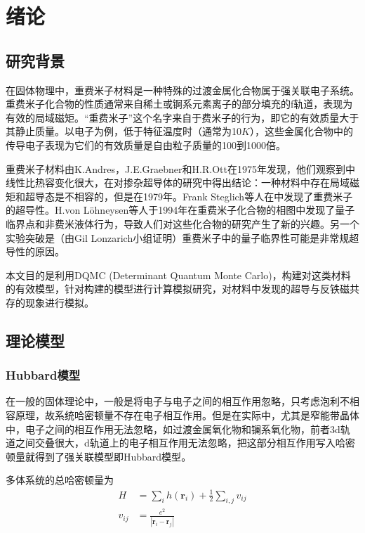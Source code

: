 \section{绪论}
\subsection{研究背景}
在固体物理中，重费米子材料是一种特殊的过渡金属化合物属于强关联电子系统。重费米子化合物的性质通常来自稀土或锕系元素离子的部分填充的f轨道，表现为有效的局域磁矩。“重费米子”这个名字来自于费米子的行为，即它的有效质量大于其静止质量。以电子为例，低于特征温度时（通常为10$K$），这些金属化合物中的传导电子表现为它们的有效质量是自由粒子质量的100到1000倍。

重费米子材料由K.Andres，J.E.Graebner和H.R.Ott在1975年发现，他们观察到中线性比热容变化很大，在对掺杂超导体的研究中得出结论：一种材料中存在局域磁矩和超导态是不相容的，但是在1979年。Frank Steglich等人在中发现了重费米子的超导性。H.von Löhneysen等人于1994年在重费米子化合物的相图中发现了量子临界点和非费米液体行为，导致人们对这些化合物的研究产生了新的兴趣。另一个实验突破是（由Gil Lonzarich小组证明）重费米子中的量子临界性可能是非常规超导性的原因。


本文目的是利用DQMC (Determinant Quantum Monte Carlo)，构建对这类材料的有效模型，针对构建的模型进行计算模拟研究，对材料中发现的超导与反铁磁共存的现象进行模拟。






\subsection{理论模型}

\subsubsection{Hubbard模型}
在一般的固体理论中，一般是将电子与电子之间的相互作用忽略，只考虑泡利不相容原理，故系统哈密顿量不存在电子相互作用。但是在实际中，尤其是窄能带晶体中，电子之间的相互作用无法忽略，如过渡金属氧化物和镧系氧化物，前者3d轨道之间交叠很大，d轨道上的电子相互作用无法忽略，把这部分相互作用写入哈密顿量就得到了强关联模型即Hubbard模型\cite{11}。

多体系统的总哈密顿量为
\begin{align*}
    H&=\sum_i h(\textbf{r}_i)+\frac{1}{2}\sum_{i,j}v_{ij}\\
    v_{ij}&=\frac{e^2}{|\textbf{r}_i-\textbf{r}_j|}
\end{align*}

